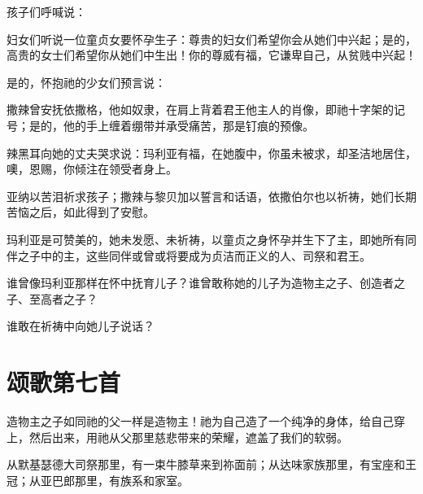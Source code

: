 孩子们呼喊说：\par

妇女们听说一位童贞女要怀孕生子：尊贵的妇女们希望你会从她们中兴起；是的，高贵的女士们希望你从她们中生出！你的尊威有福，它谦卑自己，从贫贱中兴起！\par

是的，怀抱祂的少女们预言说：\par

撒辣曾安抚依撒格，他如奴隶，在肩上背着君王他主人的肖像，即祂十字架的记号；是的，他的手上缠着绷带并承受痛苦，那是钉痕的预像。\par

辣黑耳向她的丈夫哭求说：玛利亚有福，在她腹中，你虽未被求，却圣洁地居住，噢，恩赐，你倾注在领受者身上。\par

亚纳以苦泪祈求孩子；撒辣与黎贝加以誓言和话语，依撒伯尔也以祈祷，她们长期苦恼之后，如此得到了安慰。\par

玛利亚是可赞美的，她未发愿、未祈祷，以童贞之身怀孕并生下了主，即她所有同伴之子中的主，这些同伴或曾或将要成为贞洁而正义的人、司祭和君王。\par

谁曾像玛利亚那样在怀中抚育儿子？谁曾敢称她的儿子为造物主之子、创造者之子、至高者之子？\par

谁敢在祈祷中向她儿子说话？\par


\section{颂歌第七首}

造物主之子如同祂的父一样是造物主！祂为自己造了一个纯净的身体，给自己穿上，然后出来，用祂从父那里慈悲带来的荣耀，遮盖了我们的软弱。\par

从默基瑟德大司祭那里，有一束牛膝草来到祢面前；从达味家族那里，有宝座和王冠；从亚巴郎那里，有族系和家室。\par

